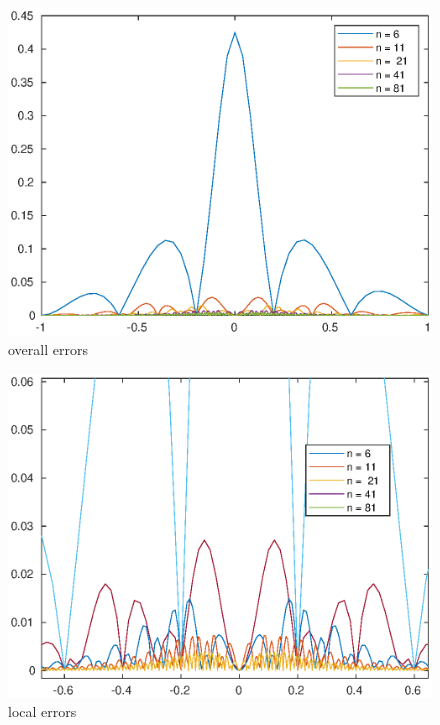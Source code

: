 \documentclass[twoside,a4paper]{article}
\begin{document}
\begin{figure}[h]
\includegraphics[width=7in]{error1.eps}
\caption{overall errors}
\end{figure}

\begin{figure}[h]
\includegraphics[width=7in]{error2.eps}
\caption{local errors}
\end{figure}
\end{document}

